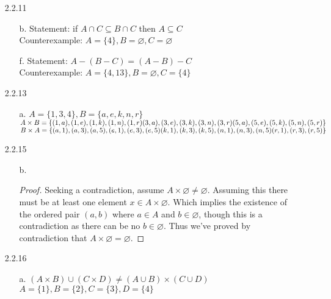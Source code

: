 \documentclass[11pt]{amsart}
\theoremstyle{definition}
\begin{document}
\begin{itemize}
\begin{itemize}
\end{itemize}

\item[2.2.11]
\begin{itemize}
    \item[b.] Statement: if $A\cap C\subseteq B\cap C$ then $A\subseteq C$ \\
              Counterexample: $A=\{4\},B=\varnothing,C=\varnothing$

    \item[f.] Statement: $A-(B-C)=(A-B)-C$ \\
              Counterexample: $A=\{4,13\},B=\varnothing,C=\{4\}$

\end{itemize}

\item[2.2.13]
\begin{itemize}
    \item[a.] $A=\{1,3,4\}, B=\{a,e,k,n,r\}$ \\
              $A\times B=\{(1,a),(1,e),(1,k),(1,n),(1,r) \\
                           (3,a),(3,e),(3,k),(3,n),(3,r) \\
                           (5,a),(5,e),(5,k),(5,n),(5,r)\}$ \\
              $B\times A=\{(a,1),(a,3),(a,5),(e,1),(e,3),(e,5) \\
                           (k,1),(k,3),(k,5),(n,1),(n,3),(n,5) \\
                           (r,1),(r,3),(r,5)\}$
    
\end{itemize}

\item[2.2.15]
\begin{itemize}
    \item[b.] \begin{proof}
        Seeking a contradiction, assume $A\times \varnothing\ne \varnothing$. Assuming this there must be at least one element $x\in A\times \varnothing$. Which implies the existence of the ordered pair $(a,b)$ where $a\in A$ and $b\in\varnothing$, though this is a contradiction as there can be no $b\in\varnothing$. Thus we've proved by contradiction that $A\times \varnothing=\varnothing$.
    \end{proof}
    
\end{itemize}

\item[2.2.16]
\begin{itemize}
    \item[a.] $(A\times B)\cup(C\times D)\ne(A\cup B)\times(C\cup D)$ \\
              $A=\{1\},B=\{2\},C=\{3\},D=\{4\}$
    

\end{itemize}
\end{itemize}
\end{document}
